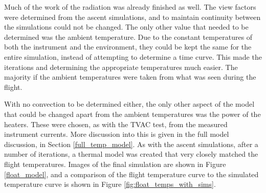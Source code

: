 Much of the work of the radiation was already finished as well. The view factors were determined from the ascent simulations, and to maintain continuity between the simulations could not be changed. The only other value that needed to be determined was the ambient temperature. Due to the constant temperatures of both the instrument and the environment, they could be kept the same for the entire simulation, instead of attempting to determine a time curve. This made the iterations and determining the appropriate temperatures much easier. The majority if the ambient temperatures were taken from what was seen during the flight. 

With no convection to be determined either, the only other aspect of the model that could be changed apart from the ambient temperatures was the power of the heaters. These were chosen, as with the TVAC test, from the measured instrument currents. More discussion into this is given in the full model discussion, in Section \ref{full_temp_model}. As with the ascent simulations, after a number of iterations, a thermal model was created that very closely matched the flight temperatures. Images of the final simulation are shown in Figure \ref{float_model}, and a comparison of the flight temperature curve to the simulated temperature curve is shown in Figure \ref{fig:float_temps_with_sims}.

